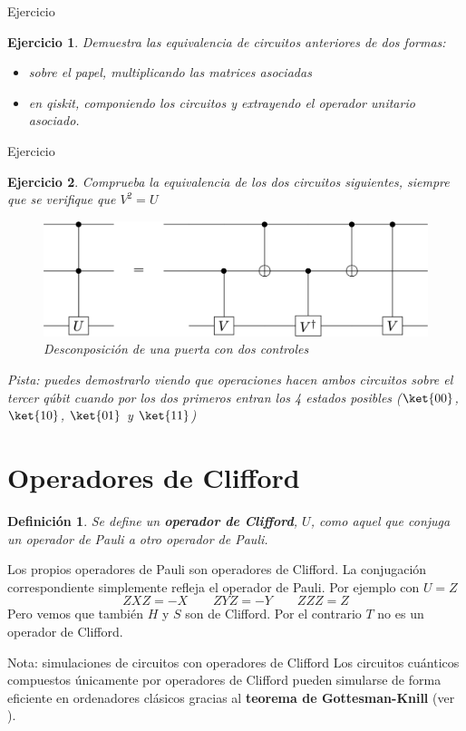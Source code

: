\documentclass[a4paper,11pt]{book} %
\newtheorem{definicion_contador}{Definición}
\newcommand{\Definicion}[1]{
		\begin{mybox_gray2}{}
			\begin{definicion_contador}
				 #1 
			\end{definicion_contador} 
		\end{mybox_gray2}
	}
\newtheorem{ejercicio_contador}{Ejercicio}
\newcommand{\Ejercicio}[1]{
		\begin{mybox_gray}{Ejercicio} 
			\begin{ejercicio_contador}
				 #1 
			\end{ejercicio_contador} 
		\end{mybox_gray}
	}
\numberwithin{equation}{chapter}
\begin{document}
	\Ejercicio{
	Demuestra las equivalencia de circuitos anteriores de dos formas:
	\begin{itemize}
		\item[a)] sobre el papel,  multiplicando las matrices asociadas
		\item[b)] en qiskit, componiendo los circuitos y extrayendo el operador unitario asociado.
	\end{itemize}
	}
	
	\Ejercicio{
	Comprueba la equivalencia de los dos circuitos siguientes, siempre que se verifique que $V^2 = U$
		\begin{figure}[H]
		\centering 
		\includegraphics[width=0.60\linewidth]{Figuras/Fig_elementos_CCUdecomposition.png}
		\caption{Desconposición de una puerta con dos controles}
		\label{Fig_elementos_CCUdecomposition}
		\end{figure}
	Pista: puedes demostrarlo viendo que operaciones hacen ambos circuitos sobre el tercer qúbit cuando por los dos
	primeros entran los 4 estados posibles ($\ket{00}$, $\ket{10}$, $\ket{01}$ y $\ket{11}$)
	}		
	
    \section{Operadores de Clifford}

	\Definicion{
	Se define un \textbf{operador de Clifford}, $U$, como aquel que conjuga un operador de Pauli a otro operador de Pauli.
	}
	
	Los propios operadores de Pauli son operadores de Clifford.  La conjugación correspondiente simplemente refleja el operador de Pauli. Por ejemplo con $U=Z$
	\begin{equation}
	ZXZ = -X~~~~~~~~~ZYZ = -Y ~~~~~~~~~ZZZ = Z 
	\end{equation}
Pero vemos que también $H$ y $S$ son de Clifford. Por el contrario $T$ no es un operador de Clifford.

	\begin{mybox_blue}{Nota: simulaciones de circuitos con operadores de Clifford}
	Los circuitos cuánticos compuestos únicamente por operadores de Clifford pueden simularse de forma eficiente en ordenadores
	clásicos gracias al \textbf{teorema de Gottesman-Knill} (ver \cite{bib_Gottesman-Knill}).
	\end{mybox_blue}
\end{document}

